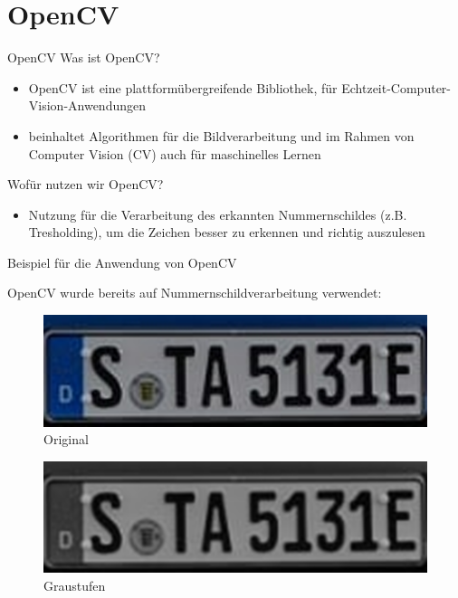 \section{OpenCV}

\begin{frame}{OpenCV}
    Was ist OpenCV?
   \begin{itemize}
   \item OpenCV ist eine plattformübergreifende Bibliothek, für Echtzeit-Computer-Vision-Anwendungen
   \item beinhaltet Algorithmen für die Bildverarbeitung und im Rahmen von Computer Vision (CV) auch für maschinelles Lernen
    \end{itemize}
    
   Wofür nutzen wir OpenCV?
   \begin{itemize}
   \item Nutzung für die Verarbeitung des erkannten Nummernschildes (z.B. Tresholding), um die Zeichen besser zu erkennen und richtig auszulesen
   
   \end{itemize}
\end{frame}

\begin{frame}{Beispiel für die Anwendung von OpenCV}

OpenCV wurde bereits auf Nummernschildverarbeitung verwendet:
\begin{figure}
\begin{center}
\includegraphics[scale=0.25]{bilder/Nummer_1.png}
\caption{Original}
\label{Original}
\end{center}
\end{figure}

\begin{figure}
\begin{center}
\includegraphics[scale=0.25]{bilder/Nummer_2_grau.png}
\caption{Graustufen}
\label{Graustufen}
\end{center}
\end{figure}

\end{frame}

